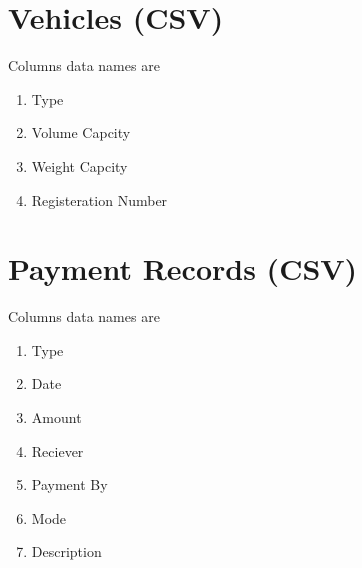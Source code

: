 \documentclass[12pt,a4paper]{report}
\begin{document}
\section{Vehicles (CSV)}
Columns data names are
\begin{enumerate}
\item Type
\item Volume Capcity
\item Weight Capcity 
\item Registeration Number
\end{enumerate}


\section{Payment Records (CSV)}
Columns data names are
\begin{enumerate}
\item Type 
\item Date
\item Amount 
\item Reciever  
\item Payment By  
\item Mode 
\item Description 
\end{enumerate}

\newpage
\end{document}

